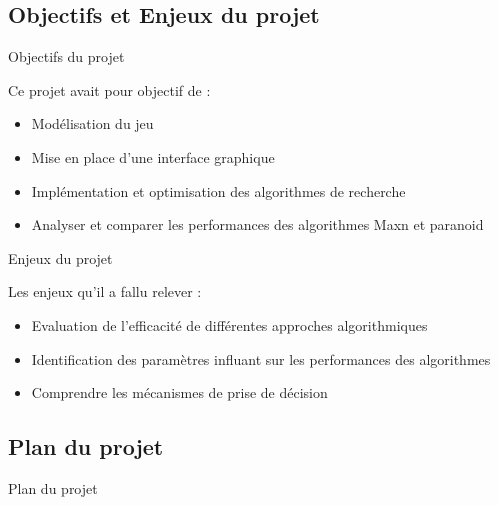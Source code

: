 \subsection*{Objectifs et Enjeux du projet}

    \begin{frame}{Objectifs du projet}
        \begin{block}{Ce projet avait pour objectif de :}
            \begin{itemize}
                \item Modélisation du jeu
                \item Mise en place d'une interface graphique
                \item Implémentation et optimisation des algorithmes de recherche
                \item Analyser et comparer les performances des algorithmes Maxn et paranoid
            \end{itemize}
        \end{block}
    \end{frame}

    \begin{frame}{Enjeux du projet}
        \begin{block}{Les enjeux qu'il a fallu relever :}
            \begin{itemize}
                \item Evaluation de l'efficacité de différentes approches algorithmiques 
                \item Identification des paramètres influant sur les performances des algorithmes
                \item Comprendre les mécanismes de prise de décision
            \end{itemize}
        \end{block}
    \end{frame}

\subsection*{Plan du projet}
    \begin{frame}{Plan du projet}
        \tableofcontents
    \end{frame}